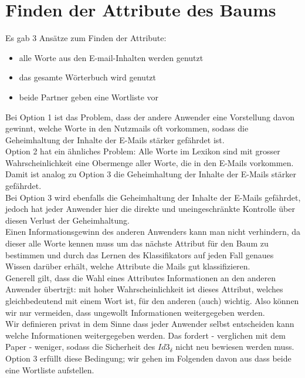 \documentclass{article}
\begin{document}
\section{Finden der Attribute des Baums}
Es gab 3 Ans\"atze zum Finden der Attribute:
\begin{itemize}
\item alle Worte aus den E-mail-Inhalten werden genutzt
\item das gesamte W\"orterbuch wird genutzt
\item beide Partner geben eine Wortliste vor
\end{itemize}

Bei Option 1 ist das Problem, dass der andere Anwender eine Vorstellung davon
gewinnt, welche Worte in den Nutzmails oft vorkommen, sodass die Geheimhaltung
der Inhalte der E-Mails st\"arker gef\"ahrdet ist.\\
Option 2 hat ein \"ahnliches Problem: Alle Worte im Lexikon sind mit grosser
Wahrscheinlichkeit eine Obermenge aller Worte, die in den E-Mails vorkommen. 
Damit ist analog zu Option 3 die Geheimhaltung der Inhalte der E-Mails st\"arker
gef\"ahrdet.\\
Bei Option 3 wird ebenfalls die Geheimhaltung der Inhalte der E-Mails 
gef\"ahrdet, jedoch hat jeder Anwender hier die direkte und uneingeschr\"ankte
Kontrolle \"uber diesen Verlust der Geheimhaltung.\\
Einen Informationsgewinn des anderen Anwenders kann man nicht verhindern,
da dieser alle Worte kennen muss um das n\"achste Attribut f\"ur den Baum zu 
bestimmen und durch das Lernen des Klassifikators auf jeden Fall genaues
Wissen dar\"uber erh\"alt, welche Attribute die Mails gut klassifizieren.\\
Generell gilt, dass die Wahl eines Attributes Informationen an den anderen
Anwender \"ubertr\"gt: mit hoher Wahrscheinlichkeit ist dieses Attribut,
welches gleichbedeutend mit einem Wort ist, f\"ur den anderen (auch) wichtig. 
Also k\"onnen wir nur vermeiden, dass ungewollt Informationen weitergegeben 
werden.\\
Wir definieren privat in dem Sinne dass jeder Anwender selbst 
entscheiden kann welche Informationen weitergegeben werden. 
Das fordert - verglichen mit dem Paper - weniger, sodass die Sicherheit des 
\(Id3_\delta\) nicht neu bewiesen werden muss.\\
Option 3 erf\"ullt diese Bedingung; wir gehen im Folgenden davon aus dass
beide eine Wortliste aufstellen.
\end{document}
